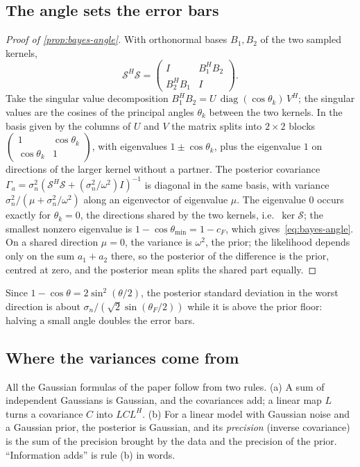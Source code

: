 \documentclass[11pt]{article}
\theoremstyle{plain}
\theoremstyle{definition}
\theoremstyle{remark}
\DeclareMathOperator{\diag}{diag}
\newcommand{\sumop}{\mathcal{S}}            %
\newcommand{\cF}{c_{F}}                     %
\newcommand{\thetaF}{\theta_{F}}            %
\newcommand{\noise}{\sigma_{n}}             %
\begin{document}
\subsection{The angle sets the error bars}\label{sm:proof-bayes}
\begin{proof}[Proof of \cref{prop:bayes-angle}]
With orthonormal bases $B_1,B_2$ of the two sampled kernels,
\[
  \sumop^H\sumop=\begin{pmatrix}I&B_1^HB_2\\ B_2^HB_1&I\end{pmatrix}.
\]
Take the singular value decomposition $B_1^HB_2=U\,\diag(\cos\theta_k)\,V^H$; the singular values are the cosines of the
principal angles $\theta_k$ between the two kernels. In the basis given by the columns of $U$ and $V$ the matrix splits into
$2\times2$ blocks $\left(\begin{smallmatrix}1&\cos\theta_k\\ \cos\theta_k&1\end{smallmatrix}\right)$, with eigenvalues
$1\pm\cos\theta_k$, plus the eigenvalue $1$ on directions of the larger kernel without a partner. The posterior covariance
$\Gamma_a=\noise^2(\sumop^H\sumop+(\noise^2/\omega^2)I)^{-1}$ is diagonal in the same basis, with variance
$\noise^2/(\mu+\noise^2/\omega^2)$ along an eigenvector of eigenvalue $\mu$. The eigenvalue $0$ occurs exactly for
$\theta_k=0$, the directions shared by the two kernels, i.e.\ $\ker\sumop$; the smallest nonzero eigenvalue is
$1-\cos\theta_{\min}=1-\cF$, which gives~\eqref{eq:bayes-angle}. On a shared direction $\mu=0$, the variance is $\omega^2$,
the prior; the likelihood depends only on the sum $a_1+a_2$ there, so the posterior of the difference is the prior,
centred at zero, and the posterior mean splits the shared part equally.
\end{proof}
Since $1-\cos\theta=2\sin^2(\theta/2)$, the posterior standard deviation in the worst direction is about
$\noise/(\sqrt2\sin(\thetaF/2))$ while it is above the prior floor: halving a small angle doubles the error bars.

\subsection{Where the variances come from}\label{sm:variances}
All the Gaussian formulas of the paper follow from two rules. (a) A sum of independent Gaussians is Gaussian, and the
covariances add; a linear map $L$ turns a covariance $C$ into $LCL^H$. (b) For a linear model with Gaussian noise and a
Gaussian prior, the posterior is Gaussian, and its \emph{precision} (inverse covariance) is the sum of the precision
brought by the data and the precision of the prior. ``Information adds'' is rule (b) in words.
\end{document}
